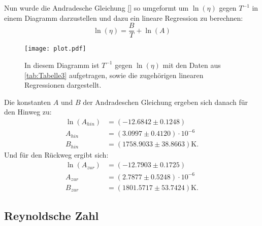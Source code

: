 Nun wurde die Andradesche Gleichung \eqref{} so umgeformt um $\ln\left(\eta\right)$ gegen $T^{-1}$ in einem Diagramm darzustellen und dazu ein lineare Regression zu berechnen:
\begin{equation*}
  \ln\left(\eta\right) = \frac{B}{T} + \ln\left(A\right)
\end{equation*}
\begin{figure}[H]
  \centering
  \texttt{[image: plot.pdf]}
  \caption{In diesem Diagramm ist $T^{-1}$ gegen $\ln\left(\eta\right)$ mit den Daten aus \autoref{tab:Tabelle3} aufgetragen, sowie die zugehörigen linearen Regressionen dargestellt.}
  \label{fig:plot}
\end{figure}
Die konstanten $A$ und $B$ der Andradeschen Gleichung ergeben sich danach für den Hinweg zu:
\begin{align*}
  \ln\left(A_{hin}\right) &= (-12.6842\pm 0.1248) \\
  A_{hin} &= (3.0997\pm 0.4120 ) \cdot 10^{-6} \\
  B_{hin} &= (1758.9033\pm 38.8663)\unit{\kelvin}.
\end{align*}
Und für den Rückweg ergibt sich:
\begin{align*}
  \ln\left(A_{zur}\right) &= (-12.7903\pm 0.1725) \\
  A_{zur} &= (2.7877\pm 0.5248 ) \cdot 10^{-6} \\
  B_{zur} &= (1801.5717\pm 53.7424)\unit{\kelvin}.
\end{align*}
\subsection{Reynoldsche Zahl}
